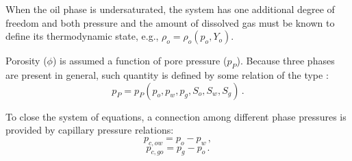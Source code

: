 \documentclass[final,authoryear,5p,twocolumn,10pt]{elsarticle}
\begin{document}
When the oil phase is undersaturated, the system has one additional degree of freedom and both pressure and the amount of dissolved gas must be known to define its thermodynamic state, e.g., $\rho_o = \rho_o (p_o,Y_o)$.

Porosity ($\phi$) is assumed a function of pore pressure ($p_P$). Because three phases are present in general, such quantity is defined by some relation of the type \citep{kim2011rigorous}:
\begin{equation}
p_P=p_P\left(p_o,p_w,p_g,S_o,S_w,S_g\right) \, .
\end{equation}

To close the system of equations, a connection among different phase pressures is provided by capillary pressure relations:
\begin{equation}\label{eq: capillary_ow}
p_{c,ow}=p_o-p_w \, ,
\end{equation}
\begin{equation}\label{eq: capillary_og}
p_{c,go}=p_g-p_o \, .
\end{equation}



%
%
%
\end{document}
